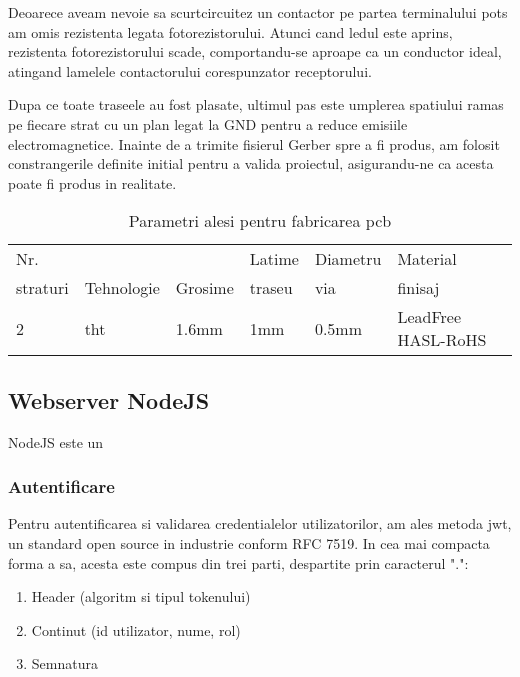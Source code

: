 Deoarece aveam nevoie sa scurtcircuitez un contactor pe partea terminalului \acrshort{pots} am omis rezistenta legata fotorezistorului. Atunci cand ledul este aprins, rezistenta fotorezistorului scade, comportandu-se aproape ca un conductor ideal, atingand lamelele contactorului corespunzator receptorului.

Dupa ce toate traseele au fost plasate, ultimul pas este umplerea spatiului ramas pe fiecare strat cu un plan legat la GND pentru a reduce emisiile electromagnetice. Inainte de a trimite fisierul Gerber spre a fi produs, am folosit constrangerile definite initial pentru a valida proiectul, asigurandu-ne ca acesta poate fi produs in realitate.

\begin{table}[ht!]
\begin{tabular}{llllll}
\hline
Nr. &  &  & Latime & Diametru & Material \\ 
straturi & Tehnologie & Grosime & traseu & via & finisaj \\
\hline
\hline
2 & \acrshort{tht} & 1.6mm & 1mm & 0.5mm & LeadFree HASL-RoHS\\
\hline
\end{tabular}
\centering
\caption{Parametri alesi pentru fabricarea \acrshort{pcb}}
\label{tab:faults}
\end{table}

\subsection {Webserver NodeJS}

NodeJS este un

\subsubsection {Autentificare}

Pentru autentificarea si validarea credentialelor utilizatorilor, am ales metoda \acrfull{jwt}, un standard open source in industrie conform RFC 7519. In cea mai compacta forma a sa, acesta este compus din trei parti, despartite prin caracterul ".":

\begin{enumerate}
  \item Header (algoritm si tipul tokenului)
  \item Continut (id utilizator, nume, rol)
  \item Semnatura
\end{enumerate}

